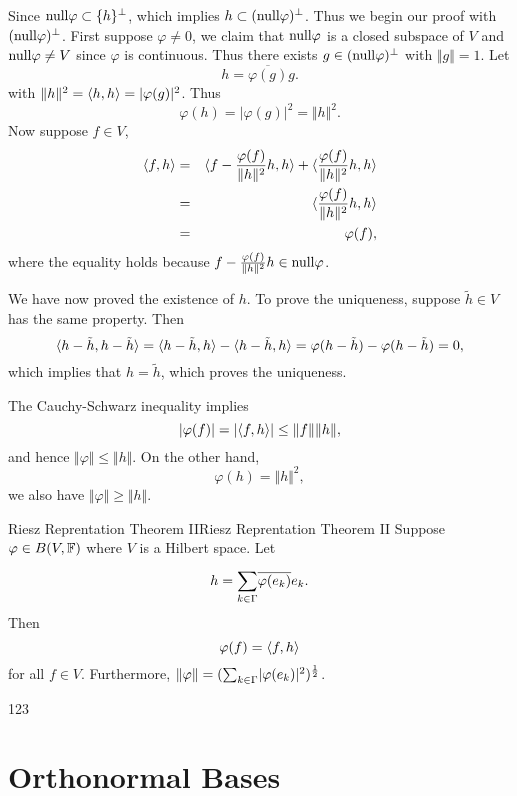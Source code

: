 \begin{Proof}
Since $\mathrm{null} \varphi \subset \{h\}^\perp$, which implies ${h}\subset (\mathrm{null} \varphi)^\perp$. Thus we begin our proof with $(\mathrm{null} \varphi)^\perp$. First suppose $\varphi \neq 0$, we claim that $\mathrm{null} \varphi$ is a closed subspace of $V$ and $\mathrm{null} \varphi \neq V$ since $\varphi$ is continuous.
Thus there exists $g \in (\mathrm{null} \varphi)^\perp$ with $\Vert g\Vert=1$. Let
$$
h = \overline{\varphi(g)}g. 
$$
with $\Vert h\Vert^2={\langle h,h\rangle}=|\varphi(g)|^2$. Thus 
$$
\varphi(h) = |\varphi(g)|^2 = \Vert h \Vert^2.
$$
Now suppose $f \in V$,
\begin{eqnarray*}
	{\langle f,h\rangle} &=& {\langle f-\frac{\varphi(f)}{\Vert h\Vert^2}h,h\rangle} + {\langle \frac{\varphi(f)}{\Vert h\Vert^2}h,h\rangle} \\
	&=& {\langle \frac{\varphi(f)}{\Vert h\Vert^2}h,h\rangle} \\
	&=& \varphi(f),
\end{eqnarray*}
where the equality holds because $f-\frac{\varphi(f)}{\Vert h\Vert^2}h \in \mathrm{null} \varphi$. \par
We have now proved the existence of $h$. To prove the uniqueness, suppose $\tilde h\in V$ has the same property. Then 
$$
{\langle h-\tilde h,h - \tilde h\rangle}={\langle h-\tilde h,h\rangle}-{\langle h-\tilde h,h\rangle}=\varphi(h-\tilde h)-\varphi(h-\tilde h)=0,
$$
which implies that $h=\tilde h$, which proves the uniqueness. \par
The Cauchy-Schwarz inequality implies 
$$
|\varphi(f)| = |{\langle f,h\rangle}| \leq \Vert f\Vert \Vert h\Vert,
$$
and hence $\Vert \varphi \Vert \leq\Vert h \Vert$. On the other hand, 
$$
\varphi(h)=\Vert h\Vert^2, 
$$
we also have $\Vert \varphi \Vert \geq \Vert h \Vert$.
\end{Proof}


\begin{stheorem}{Riesz Reprentation Theorem II}{Riesz Reprentation Theorem II}
Suppose $\varphi \in B(V,\mathbb{F})$ where $V$ is a Hilbert space. Let 
$$
h = {\sum_{k\in \Gamma}^{}} \overline{\varphi(e_k)}e_k.
$$
Then 
$$
\varphi(f) = {\langle f,h\rangle}
$$
for all $f\in V$. Furthermore, $\Vert \varphi \Vert=({\sum_{k\in \Gamma}^{}}|\varphi(e_k)|^2  )^{\frac{1}{2}}$.
\end{stheorem}
\begin{Proof}
	123
\end{Proof}






\section{Orthonormal Bases} \ \\

